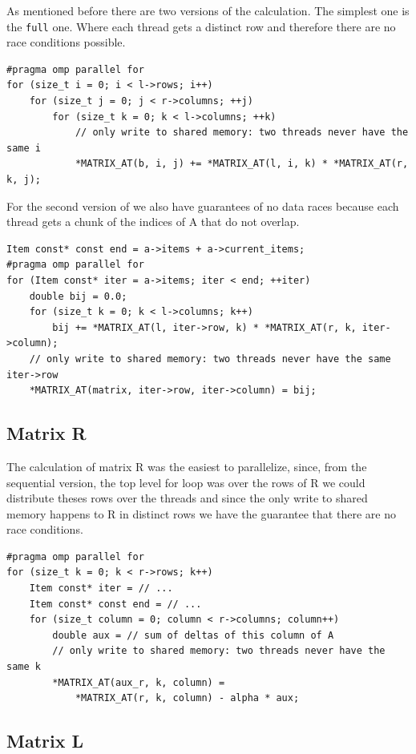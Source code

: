 \documentclass[a4paper]{article}
\begin{document}
As mentioned before there are two versions of the calculation. The simplest one
is the \texttt{full} one. Where each thread gets a distinct row and therefore
there are no race conditions possible.
\begin{verbatim}
#pragma omp parallel for
for (size_t i = 0; i < l->rows; i++)
    for (size_t j = 0; j < r->columns; ++j)
        for (size_t k = 0; k < l->columns; ++k)
            // only write to shared memory: two threads never have the same i
            *MATRIX_AT(b, i, j) += *MATRIX_AT(l, i, k) * *MATRIX_AT(r, k, j);
\end{verbatim}

For the second version of we also have guarantees of no data races because each
thread gets a chunk of the indices of A that do not overlap.
\begin{verbatim}
Item const* const end = a->items + a->current_items;
#pragma omp parallel for
for (Item const* iter = a->items; iter < end; ++iter)
    double bij = 0.0;
    for (size_t k = 0; k < l->columns; k++)
        bij += *MATRIX_AT(l, iter->row, k) * *MATRIX_AT(r, k, iter->column);
    // only write to shared memory: two threads never have the same iter->row
    *MATRIX_AT(matrix, iter->row, iter->column) = bij;
\end{verbatim}

\subsection{Matrix R}

The calculation of matrix R was the easiest to parallelize, since, from the
sequential version, the top level for loop was over the rows of R we could
distribute theses rows over the threads and since the only write to shared
memory happens to R in distinct rows we have the guarantee that there are no
race conditions.

\begin{verbatim}
#pragma omp parallel for
for (size_t k = 0; k < r->rows; k++)
    Item const* iter = // ...
    Item const* const end = // ...
    for (size_t column = 0; column < r->columns; column++)
        double aux = // sum of deltas of this column of A
        // only write to shared memory: two threads never have the same k
        *MATRIX_AT(aux_r, k, column) =
            *MATRIX_AT(r, k, column) - alpha * aux;
\end{verbatim}

\subsection{Matrix L}
\end{document}

